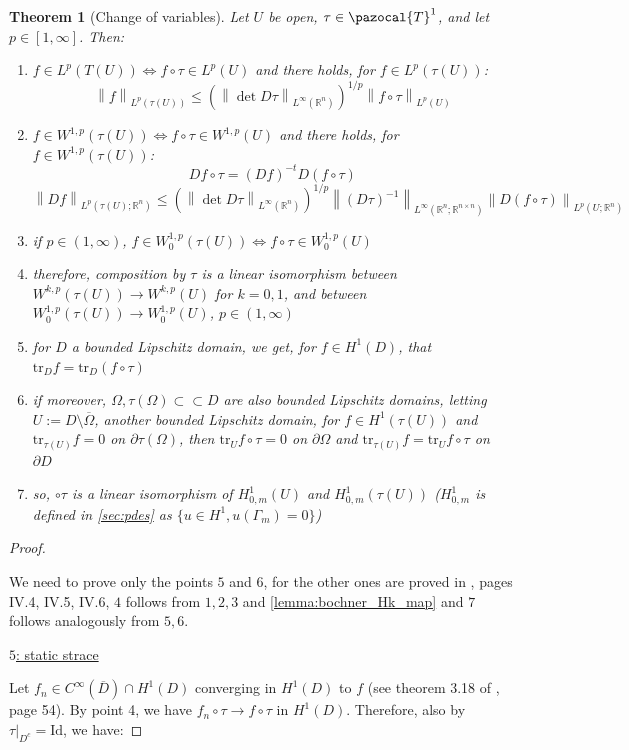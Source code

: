 \documentclass[english,a4paper,10pt,oneside]{scrbook}	%
\theoremstyle{break}
\newtheorem{thm}[equation]{Theorem}
\newenvironment{mproof}[1][\proofname]{%
  \begin{proof}[#1]$ $\par\nobreak\ignorespaces
}{%
  \end{proof}
}
\renewcommand*{\proofname}{Proof}
\theoremstyle{remark}
\newcommand{\mR}{\mathbb{R}}
\newcommand{\norm}[1]{\left\lVert#1\right\rVert}
\newcommand{\tr}{\text{tr}}
\newcommand{\cc}{\subset\subset}
\newcommand{\cT}{\pazocal{T}}
\newcommand{\id}{\text{Id}}
\begin{document}
\begin{appendices}
\begin{thm}[Change of variables]
Let $U$ be open, $\tau \in \cT^1$, and let $p \in [ 1,\infty]$. Then:

\begin{enumerate}
	\item $f \in L^p(T(U)) \iff f\circ \tau \in L^p(U)$ and there holds, for $f \in L^p(\tau(U))$:
	$$ \norm{f}_{L^p(\tau(U))}\leq \left ( \norm{\det D\tau}_{L^\infty(\mR^n)}\right)^{1/p} \norm{f\circ \tau}_{L^p(U)}$$
	\item $f \in W^{1,p}(\tau(U)) \iff f\circ \tau \in W^{1,p}(U)$ and there holds, for $f\in W^{1,p}(\tau(U))$:
	$$Df \circ \tau = (Df)^{-t}D(f\circ \tau)$$
	$$ \norm{Df}_{L^p(\tau(U);\mR^n)}\leq \left ( \norm{\det D\tau}_{L^\infty(\mR^n)}\right)^{1/p} \norm{(D\tau)^{-1}}_{L^\infty(\mR^n;\mR^{n\times n})}\norm{D(f\circ \tau)}_{L^p(U;\mR^n)}$$
	\item if $p \in (1, \infty)$, $f \in W^{1,p}_0(\tau(U)) \iff f\circ \tau \in W^{1,p}_0(U)$
	\item therefore, composition by $\tau$ is a linear isomorphism between $W^{k,p}(\tau(U))\rightarrow W^{k,p}(U)$ for $k=0,1$, and between $W^{1,p}_0(\tau(U))\rightarrow W^{1,p}_0(U)$, $p \in (1, \infty)$
	\item for $D$ a bounded Lipschitz domain, we get, for $f \in H^1(D)$, that $\tr_D f = \tr_D(f\circ \tau)$
	\item if moreover, $\Omega, \tau(\Omega) \cc D$ are also bounded Lipschitz domains, letting $U:=D\setminus \overline{\Omega}$, another bounded Lipschitz domain, for $f \in H^1(\tau(U))$ and $\tr_{\tau(U)} f =0 $ on $ \partial \tau(\Omega) $, then $\tr_{U} f\circ \tau=0$ on $\partial \Omega$ and $\tr_{\tau(U)} f = \tr_{U} f\circ \tau$ on $\partial D$
	\item so, $\circ \tau$ is a linear isomorphism of $H^1_{0,m}(U)$ and $H^1_{0,m}(\tau(U))$ ($H^1_{0,m}$ is defined in \cref{sec:pdes} as $\{u \in H^1, u(\Gamma_m)=0\}$)
\end{enumerate}

\end{thm}

\begin{mproof}

We need to prove only the points $5$ and $6$, for the other ones are proved in \cite{murat}, pages IV.4, IV.5, IV.6, $4$ follows from $1,2,3$ and \cref{lemma:bochner_Hk_map} and $7$ follows analogously from $5,6$.

\underline{$5$: static strace}

Let $f_n \in C^\infty(\overline{D})\cap H^1(D)$ converging in $H^1(D)$ to $f$ (see theorem 3.18 of \cite{adams}, page 54). By point 4, we have $f_n \circ \tau\rightarrow f\circ \tau$ in $H^1(D)$. Therefore, also by $\tau|_{D^c} = \id$, we have:


\end{mproof}
\end{appendices}
\end{document}
